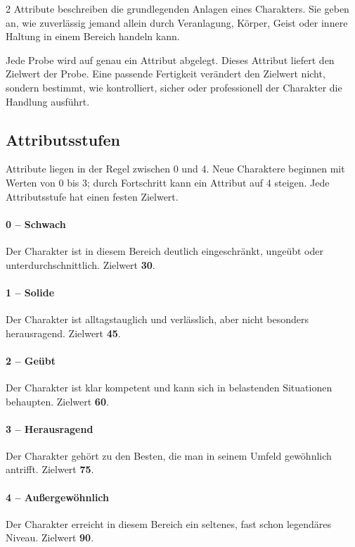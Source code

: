 \begin{multicols*}{2}
Attribute beschreiben die grundlegenden Anlagen eines Charakters.
Sie geben an, wie zuverlässig jemand allein durch Veranlagung, Körper, Geist oder innere Haltung in einem Bereich handeln kann.

Jede Probe wird auf genau ein Attribut abgelegt.
Dieses Attribut liefert den Zielwert der Probe.
Eine passende Fertigkeit verändert den Zielwert nicht, sondern bestimmt, wie kontrolliert, sicher oder professionell der Charakter die Handlung ausführt.

\subsection{Attributsstufen}

Attribute liegen in der Regel zwischen 0 und 4.
Neue Charaktere beginnen mit Werten von 0 bis 3; durch Fortschritt kann ein Attribut auf 4 steigen.
Jede Attributsstufe hat einen festen Zielwert.

\paragraph{0 -- Schwach}
Der Charakter ist in diesem Bereich deutlich eingeschränkt, ungeübt oder unterdurchschnittlich. Zielwert \textbf{30}.

\paragraph{1 -- Solide}
Der Charakter ist alltagstauglich und verlässlich, aber nicht besonders herausragend. Zielwert \textbf{45}.

\paragraph{2 -- Geübt}
Der Charakter ist klar kompetent und kann sich in belastenden Situationen behaupten. Zielwert \textbf{60}.

\paragraph{3 -- Herausragend}
Der Charakter gehört zu den Besten, die man in seinem Umfeld gewöhnlich antrifft. Zielwert \textbf{75}.

\paragraph{4 -- Außergewöhnlich}
Der Charakter erreicht in diesem Bereich ein seltenes, fast schon legendäres Niveau. Zielwert \textbf{90}.


\end{multicols*}
